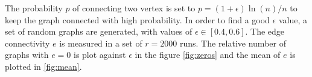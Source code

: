 \documentclass[a4paper]{article}
\begin{document}
The probability $p$ of connecting two vertex is set to $p = (1+\epsilon) 
\ln(n)/n$ to keep the graph connected with high probability. In order to find a 
good $\epsilon$ value, a set of random graphs are generated, with values of 
$\epsilon \in [0.4, 0.6]$. The edge connectivity $e$ is measured in a set of 
$r=2000$ runs. The relative number of graphs with $e = 0$ is plot against 
$\epsilon$ in the figure \ref{fig:zeros} and the mean of $e$ is plotted in 
\ref{fig:mean}.
%
\begin{figure}[htp]
	\hfill%
\end{figure}
\end{document}
